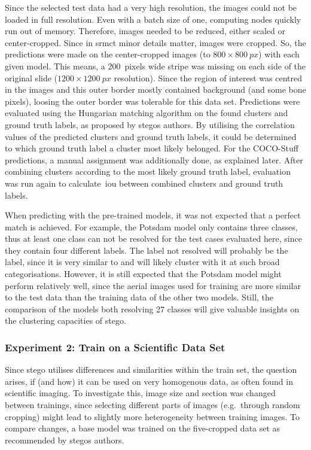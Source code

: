 Since the selected test data had a very high resolution, the images could not be loaded in full resolution.
Even with a batch size of one, computing nodes quickly run out of memory.
Therefore, images needed to be reduced, either scaled or center-cropped.
Since in \gls{srmct} minor details matter, images were cropped.
So, the predictions were made on the center-cropped images (to $800 \times 800~px$) with each given model.
This means, a 200~pixels wide stripe was missing on each side of the original slide ($1200 \times 1200~px$ resolution).
Since the region of interest was centred in the images and this outer border mostly contained background (and some bone pixels), loosing the outer border was tolerable for this data set.
Predictions were evaluated using the Hungarian matching algorithm on the found clusters and ground truth labels, as proposed by \gls{stego}s authors.
By utilising the correlation values of the predicted clusters and ground truth labels, it could be determined to which ground truth label a cluster most likely belonged.
For the COCO-Stuff predictions, a manual assignment was additionally done, as explained later.
After combining clusters according to the most likely ground truth label, evaluation was run again to calculate~\gls{iou} between combined clusters and ground truth labels.

When predicting with the pre-trained models, it was not expected that a perfect match is achieved.
For example, the Potsdam model only contains three classes, thus at least one class can not be resolved for the test cases evaluated here, since they contain four different labels.
The label not resolved will probably be the  label, since it is very similar to  and will likely cluster with it at such broad categorisations.
However, it is still expected that the Potsdam model might perform relatively well, since the aerial images used for training are more similar to the test data than the training data of the other two models.
Still, the comparison of the models both resolving 27 classes will give valuable insights on the clustering capacities of \gls{stego}.


\subsubsection{Experiment 2: Train on a Scientific Data Set}
Since \gls{stego} utilises differences and similarities within the train set, the question arises, if (and how) it can be used on very homogenous data, as often found in scientific imaging.
To investigate this, image size and section was changed between trainings, since selecting different parts of images (e.g.~through random cropping) might lead to slightly more heterogeneity between training images.
To compare changes, a base model was trained on the five-cropped data set as recommended by \gls{stego}s authors.

